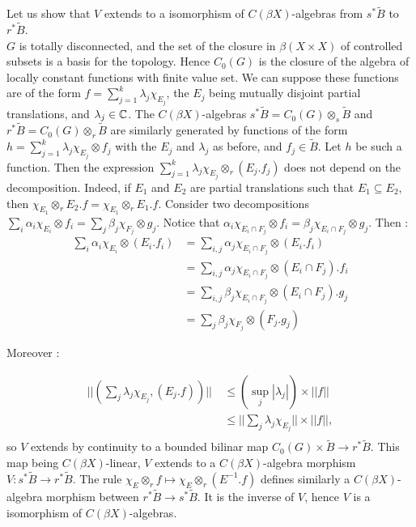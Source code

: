 \begin{dem}
Let us show that $V$ extends to a isomorphism of $C(\beta X)$-algebras from $s^* \tilde B$ to $r^*\tilde B$.\\

$G$ is totally disconnected, and the set of the closure in $\beta (X\times X)$ of controlled subsets is a basis for the topology. Hence $C_0(G)$ is the closure of the algebra of locally constant functions with finite value set. We can suppose these functions are of the form $f = \sum_{j=1}^k \lambda_j\chi_{E_j}$, the $E_j$ being mutually disjoint partial translations, and $\lambda_j\in \mathbb C$. The $C(\beta X)$-algebras $s^* \tilde B = C_0(G) \otimes_s \tilde B$ and $r^* \tilde B = C_0(G) \otimes_r \tilde B$ are similarly generated by functions of the form $h = \sum_{j=1}^k \lambda_j\chi_{E_j}\otimes f_j$ with the $E_j$ and $\lambda_j$ as before, and $f_j\in\tilde B$. Let $h$ be such a function. Then the expression $\sum_{j=1}^k \lambda_j\chi_{E_j}\otimes_r (E_j.f_j)$ does not depend on the decomposition. Indeed, if $E_1$ and $E_2$ are partial translations such that $E_1\subseteq E_2$, then $\chi_{E_1} \otimes_r E_2.f = \chi_{E_1} \otimes_r E_1.f $. Consider two decompositions $\sum_{i} \alpha_i\chi_{E_i}\otimes f_i= \sum_{j} \beta_j\chi_{F_j}\otimes g_j$. Notice that $\alpha_i \chi_{E_i\cap F_j }\otimes f_i = \beta_j \chi_{E_i\cap F_j }\otimes g_j$. Then :
\[ \begin{array}{rl}
  \sum_{i} \alpha_i\chi_{E_i}\otimes (E_i.f_i)  & = \sum_{i,j} \alpha_j\chi_{E_i\cap F_j}\otimes (E_i.f_i)         \\
						& = \sum_{i,j} \alpha_j\chi_{E_i\cap F_j}\otimes (E_i\cap F_j).f_i \\
						& = \sum_{i,j} \beta_j\chi_{E_i\cap F_j}\otimes (E_i\cap F_j).g_j  \\
						& = \sum_{j} \beta_j\chi_{F_j}\otimes (F_j.g_j)
\end{array}\]

Moreover :

\[ \begin{array}{rl} 
||(\sum_j \lambda_j\chi_{E_j}, (E_j.f))|| 
 \ & \leq (\sup_j |\lambda_j|) \times  ||f|| \\ 
\ & \leq ||\sum_j \lambda_j \chi_{E_j}|| \times  ||f||, \\
\end{array}\]
so $V$ extends by continuity to a bounded bilinar map $ C_0(G)\times\tilde B \rightarrow r^* \tilde B$. This map being $C(\beta X)$-linear, $V$ extends to a $C(\beta X)$-algebra morphism $V :s^*\tilde B \rightarrow r^* \tilde B$. The rule $\chi_E \otimes_r f\mapsto \chi_E \otimes_r (E^{-1}.f)$ defines similarly a $C(\beta X)$-algebra morphism between $r^*\tilde B \rightarrow s^*\tilde B$. It is the inverse of $V$, hence $V$ is a isomorphism of $C(\beta X)$-algebras.\\


\end{dem}
